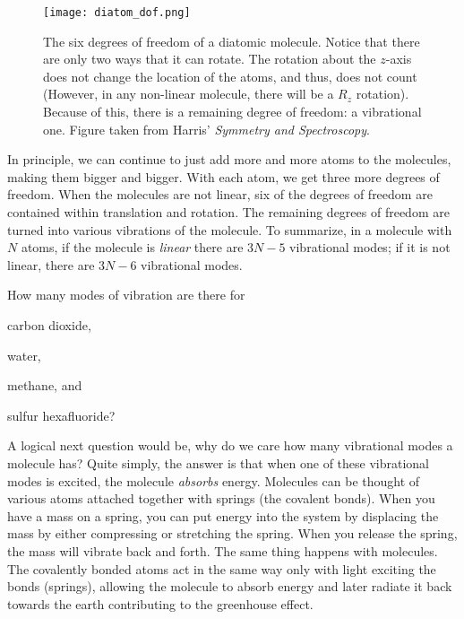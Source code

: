     \begin{figure}[ht]
         \centering
         \texttt{[image: diatom\_dof.png]}
         \caption{The six degrees of freedom of a diatomic molecule. Notice that there are only two ways that it can rotate. The rotation about the $z$-axis does not change the location of the atoms, and thus, does not count (However, in any non-linear molecule, there will be a $R_z$ rotation). Because of this, there is a remaining degree of freedom: a vibrational one. Figure taken from Harris' \emph{Symmetry and Spectroscopy}.\cite{harris1978symmetry}}
         \label{fig:diatom_dof}
     \end{figure} 

    In principle, we can continue to just add more and more atoms to the molecules, making them bigger and bigger. With each atom, we get three more degrees of freedom. When the molecules are not linear, six of the degrees of freedom are contained within translation and rotation. The remaining degrees of freedom are turned into various vibrations of the molecule. To summarize, in a molecule with $N$ atoms, if the molecule is \emph{linear} there are $3N -5$ vibrational modes; if it is not linear, there are $3N-6$ vibrational modes.

    \begin{exercise}
        How many modes of vibration are there for 
        \begin{enumerate*}[(a)]
            \item carbon dioxide,
            \item water,
            \item methane, and
            \item sulfur hexafluoride?
        \end{enumerate*}   
        \label{ex:vib_numbers}
    \end{exercise}

    A logical next question would be, why do we care how many vibrational modes a molecule has? Quite simply, the answer is that when one of these vibrational modes is excited, the molecule \emph{absorbs} energy. Molecules can be thought of various atoms attached together with springs (the covalent bonds). When you have a mass on a spring, you can put energy into the system by displacing the mass by either compressing or stretching the spring. When you release the spring, the mass will vibrate back and forth. The same thing happens with molecules. The covalently bonded atoms act in the same way only with light exciting the bonds (springs), allowing the molecule to absorb energy and later radiate it back towards the earth contributing to the greenhouse effect.

